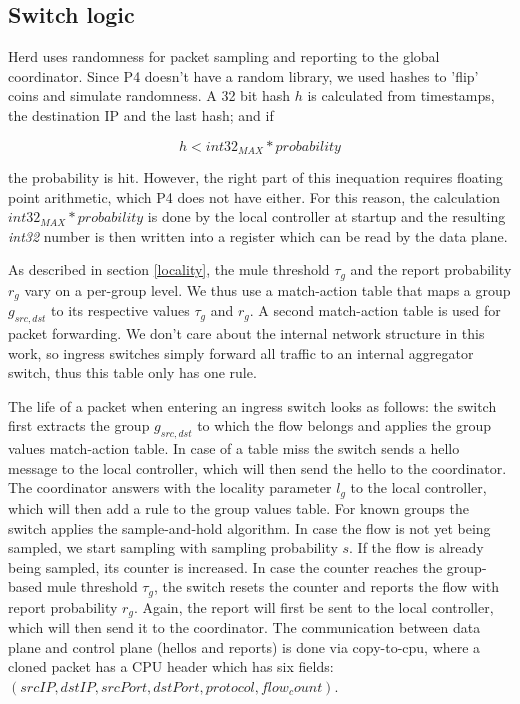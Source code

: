 \documentclass[11pt,oneside,a4paper]{article}
\begin{document}
\subsection{Switch logic} \label{switch}
Herd uses randomness for packet sampling and reporting to the global coordinator. Since P4 doesn't have a random library, we used hashes to 'flip' coins and simulate randomness.
\noindent A  32 bit hash $h$ is calculated from timestamps, the destination IP and the last hash; and if 

$$h < int32_{MAX} * probability$$

\noindent the probability is hit. However, the right part of this inequation requires floating point arithmetic, which P4 does not have either. For this reason, the calculation $int32_{MAX} * probability$ is done by the local controller at startup and the resulting \textit{int32} number is then written into a register which can be read by the data plane.

As described in section \ref{locality}, the mule threshold $\tau_g$ and the report probability $r_g$ vary on a per-group level. We thus use a match-action table that maps a group $g_{src,dst}$ to its respective values $\tau_g$ and $r_g$. A second match-action table is used for packet forwarding. We don't care about the internal network structure in this work, so ingress switches simply forward all traffic to an internal aggregator switch, thus this table only has one rule.

The life of a packet when entering an ingress switch looks as follows: the switch first extracts the group $g_{src,dst}$ to which the flow belongs and applies the group values match-action table. In case of a table miss the switch sends a hello message to the local controller, which will then send the hello to the coordinator. The coordinator answers with the locality parameter $l_g$ to the local controller, which will then add a rule to the group values table. For known groups the switch applies the sample-and-hold algorithm. In case the flow is not yet being sampled, we start sampling with sampling probability $s$. If the flow is already being sampled, its counter is increased. In case the counter reaches the group-based mule threshold $\tau_g$, the switch resets the counter and reports the flow with report probability $r_g$. Again, the report will first be sent to the local controller, which will then send it to the coordinator. The communication between data plane and control plane (hellos and reports) is done via copy-to-cpu, where a cloned packet has a CPU header which has six fields: $(srcIP, dstIP, srcPort, dstPort, protocol, flow_count)$.
\end{document}

